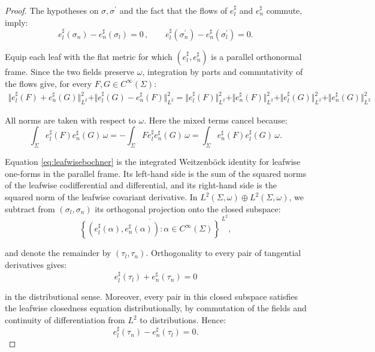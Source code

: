 \documentclass[10pt,reqno,a4paper]{amsart}
\theoremstyle{plain}
\theoremstyle{definition}
\theoremstyle{remark}
\theoremstyle{remark}
\renewcommand{\(}{ (}
\renewcommand{\)}{ )}
\begin{document}
\begin{proof}
\noindent
The hypotheses on $\sigma,\sigma^{\prime}$ and the fact that the flows of $e^{\sharp}_l$ and $e^{\sharp}_n$ commute, imply:
\begin{equation*}
e_l^{\sharp}(\sigma_n)-e_n^{\sharp}(\sigma_l)=0\, ,
\qquad
e_l^{\sharp}(\sigma_n^{\prime})-e_n^{\sharp}(\sigma_l^{\prime})=0.
\end{equation*}

\noindent
Equip each leaf with the flat metric for which $(e_l^{\sharp},e_n^{\sharp})$ is a parallel orthonormal frame. Since the two fields preserve $\omega$, integration by parts and commutativity of the flows give, for every $F,G\in C^{\infty}(\Sigma)$:
\begin{eqnarray}
\label{eq:leafwisebochner}
\Vert e_l^{\sharp}(F)+e_n^{\sharp}(G)\Vert_{L^2}^2
+\Vert e_l^{\sharp}(G)-e_n^{\sharp}(F)\Vert_{L^2}^2 = \Vert e_l^{\sharp}(F)\Vert_{L^2}^2
+\Vert e_n^{\sharp}(F)\Vert_{L^2}^2
+\Vert e_l^{\sharp}(G)\Vert_{L^2}^2
+\Vert e_n^{\sharp}(G)\Vert_{L^2}^2
\end{eqnarray}

\noindent
All norms are taken with respect to $\omega$. Here the mixed terms cancel because:
\begin{equation*}
\int_{\Sigma}e_l^{\sharp}(F)e_n^{\sharp}(G)\,\omega
=-\int_{\Sigma}F e_l^{\sharp}e_n^{\sharp}(G)\,\omega
=\int_{\Sigma}e_n^{\sharp}(F)e_l^{\sharp}(G)\,\omega.
\end{equation*}

\noindent
Equation \eqref{eq:leafwisebochner} is the integrated Weitzenb\"ock identity for leafwise one-forms in the parallel frame. Its left-hand side is the sum of the squared norms of the leafwise codifferential and differential, and its right-hand side is the squared norm of the leafwise covariant derivative. In $L^2(\Sigma,\omega)\oplus L^2(\Sigma,\omega)$, we subtract from $(\sigma_l,\sigma_n)$ its orthogonal projection onto the closed subspace:
\begin{equation*}
\overline{\left\{
 (e_l^{\sharp}(\alpha),e_n^{\sharp}(\alpha) )
: \alpha\in C^{\infty}(\Sigma)
\right\}}^{\,L^2},
\end{equation*}

\noindent
and denote the remainder by $(\tau_l,\tau_n)$. Orthogonality to every pair of tangential derivatives gives:
\begin{equation*}
e_l^{\sharp}(\tau_l)+e_n^{\sharp}(\tau_n)=0
\end{equation*}

\noindent
in the distributional sense. Moreover, every pair in this closed subspace satisfies the leafwise closedness equation distributionally, by commutation of the fields and continuity of differentiation from $L^2$ to distributions. Hence:
\begin{equation*}
e_l^{\sharp}(\tau_n)-e_n^{\sharp}(\tau_l)=0.
\end{equation*}


\end{proof}
\end{document}

